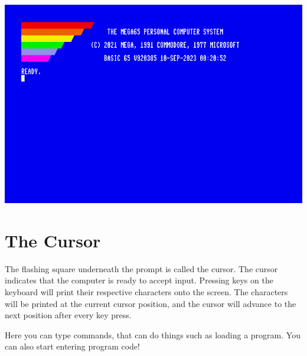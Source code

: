 \begin{center}
  \includegraphics[width=0.7\linewidth]{images/img011_final_boot_06.png}
\end{center}

\section{The Cursor}

The flashing square underneath the  prompt is called the cursor. The cursor indicates that the computer is ready to accept input. Pressing keys on the keyboard will print their respective characters onto the screen. The characters will be printed at the current cursor position, and the cursor will advance to the next position after every key press.

Here you can type commands, that can do things such as loading a program. You can also start entering program code!
